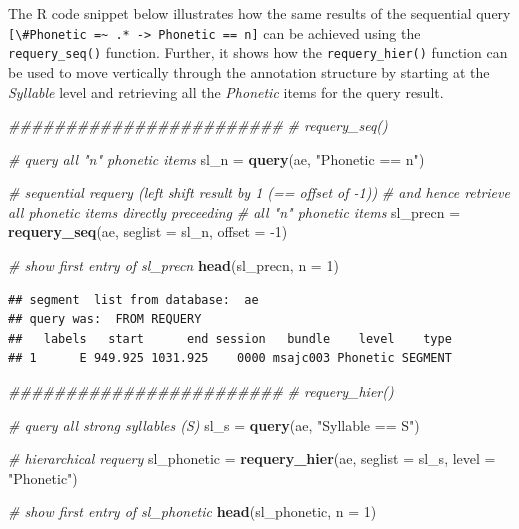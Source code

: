 \documentclass[]{book}
\newenvironment{Shaded}{\begin{snugshade}}{\end{snugshade}}
\newcommand{\CommentTok}[1]{\textcolor[rgb]{0.56,0.35,0.01}{\textit{#1}}}
\newcommand{\DataTypeTok}[1]{\textcolor[rgb]{0.13,0.29,0.53}{#1}}
\newcommand{\DecValTok}[1]{\textcolor[rgb]{0.00,0.00,0.81}{#1}}
\newcommand{\KeywordTok}[1]{\textcolor[rgb]{0.13,0.29,0.53}{\textbf{#1}}}
\newcommand{\NormalTok}[1]{#1}
\newcommand{\StringTok}[1]{\textcolor[rgb]{0.31,0.60,0.02}{#1}}
\begin{document}
The R code snippet below illustrates how the same results of the sequential query \texttt{{[}\textbackslash{}\#Phonetic\ =\textasciitilde{}\ .*\ -\textgreater{}\ Phonetic\ ==\ n{]}} can be achieved using the \texttt{requery\_seq()} function. Further, it shows how the \texttt{requery\_hier()} function can be used to move vertically through the annotation structure by starting at the \emph{Syllable} level and retrieving all the \emph{Phonetic} items for the query result.

\begin{Shaded}
\begin{Highlighting}[]
\CommentTok{########################}
\CommentTok{# requery_seq()}

\CommentTok{# query all "n" phonetic items}
\NormalTok{sl_n =}\StringTok{ }\KeywordTok{query}\NormalTok{(ae, }\StringTok{"Phonetic == n"}\NormalTok{)}

\CommentTok{# sequential requery (left shift result by 1 (== offset of -1))}
\CommentTok{# and hence retrieve all phonetic items directly preceeding}
\CommentTok{# all "n" phonetic items}
\NormalTok{sl_precn =}\StringTok{ }\KeywordTok{requery_seq}\NormalTok{(ae, }\DataTypeTok{seglist =}\NormalTok{ sl_n, }\DataTypeTok{offset =} \DecValTok{-1}\NormalTok{)}

\CommentTok{# show first entry of sl_precn}
\KeywordTok{head}\NormalTok{(sl_precn, }\DataTypeTok{n =} \DecValTok{1}\NormalTok{)}
\end{Highlighting}
\end{Shaded}

\begin{verbatim}
## segment  list from database:  ae 
## query was:  FROM REQUERY 
##   labels   start      end session   bundle    level    type
## 1      E 949.925 1031.925    0000 msajc003 Phonetic SEGMENT
\end{verbatim}

\begin{Shaded}
\begin{Highlighting}[]
\CommentTok{########################}
\CommentTok{# requery_hier()}

\CommentTok{# query all strong syllables (S)}
\NormalTok{sl_s =}\StringTok{ }\KeywordTok{query}\NormalTok{(ae, }\StringTok{"Syllable == S"}\NormalTok{)}

\CommentTok{# hierarchical requery}
\NormalTok{sl_phonetic =}\StringTok{ }\KeywordTok{requery_hier}\NormalTok{(ae, }\DataTypeTok{seglist =}\NormalTok{ sl_s,}
                           \DataTypeTok{level =} \StringTok{"Phonetic"}\NormalTok{)}

\CommentTok{# show first entry of sl_phonetic}
\KeywordTok{head}\NormalTok{(sl_phonetic, }\DataTypeTok{n =} \DecValTok{1}\NormalTok{)}
\end{Highlighting}
\end{Shaded}
\end{document}
